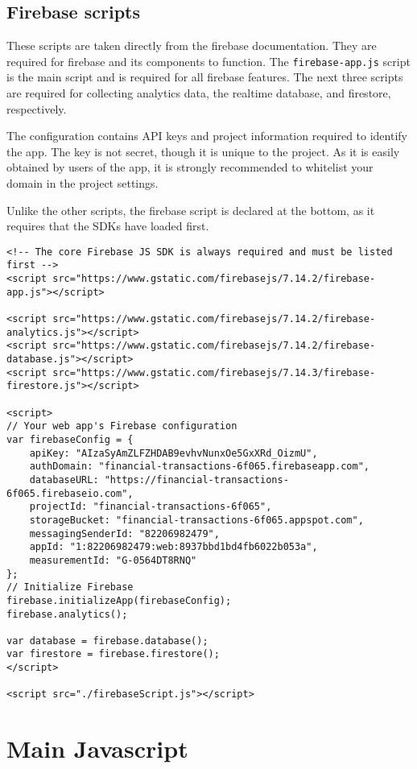 \documentclass[letterpaper]{article}
\begin{document}
\subsection{Firebase scripts}

These scripts are taken directly from the firebase documentation.
They are required for firebase and its components to function.
The \lstinline{firebase-app.js} script is the main script and is required for all firebase features.
The next three scripts are required for collecting analytics data, the realtime database, and firestore, respectively.

The configuration contains API keys and project information required to identify the app.
The key is not secret, though it is unique to the project.
As it is easily obtained by users of the app, it is strongly recommended to whitelist your domain in the project settings.

Unlike the other scripts, the firebase script is declared at the bottom, as it requires that the SDKs have loaded first.
\begin{lstlisting}[firstnumber=323]
<!-- The core Firebase JS SDK is always required and must be listed first -->
<script src="https://www.gstatic.com/firebasejs/7.14.2/firebase-app.js"></script>

<script src="https://www.gstatic.com/firebasejs/7.14.2/firebase-analytics.js"></script>
<script src="https://www.gstatic.com/firebasejs/7.14.2/firebase-database.js"></script>
<script src="https://www.gstatic.com/firebasejs/7.14.3/firebase-firestore.js"></script>

<script>
// Your web app's Firebase configuration
var firebaseConfig = {
    apiKey: "AIzaSyAmZLFZHDAB9evhvNunxOe5GxXRd_OizmU",
    authDomain: "financial-transactions-6f065.firebaseapp.com",
    databaseURL: "https://financial-transactions-6f065.firebaseio.com",
    projectId: "financial-transactions-6f065",
    storageBucket: "financial-transactions-6f065.appspot.com",
    messagingSenderId: "82206982479",
    appId: "1:82206982479:web:8937bbd1bd4fb6022b053a",
    measurementId: "G-0564DT8RNQ"
};
// Initialize Firebase
firebase.initializeApp(firebaseConfig);
firebase.analytics();

var database = firebase.database();
var firestore = firebase.firestore();
</script>

<script src="./firebaseScript.js"></script>
\end{lstlisting}

\newpage

\section{Main Javascript}\label{JS}
\end{document}
